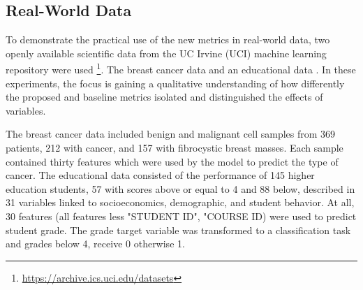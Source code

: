 \subsection{Real-World Data}
\label{sec:realWolrldData}

To demonstrate the practical use of the new metrics in real-world data, two openly available scientific data from the UC Irvine (UCI) machine learning repository were used \footnote{\url{https://archive.ics.uci.edu/datasets}}. The breast cancer data \cite{Dua:2019} and an educational data \cite{Ylmaz2020StudentTechniques}. In these experiments, the focus is gaining a qualitative understanding of how differently the proposed and baseline metrics isolated and distinguished the effects of variables. 

The breast cancer data included benign and malignant cell samples from 369 patients, 212 with cancer, and 157 with fibrocystic breast masses. Each sample contained thirty features which were used by the model to predict the type of cancer. The educational data consisted of the performance of 145 higher education students, 57 with scores above or equal to 4 and 88 below, described in 31 variables linked to socioeconomics, demographic, and student behavior. At all, 30 features (all features less "STUDENT ID", "COURSE ID) were used to predict student grade. The grade target variable was transformed to a classification task and grades below 4, receive 0 otherwise 1.



